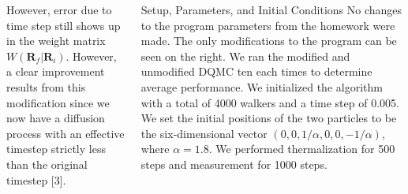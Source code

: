 \documentclass[final]{beamer}
\newlength{\sepwid}
\newlength{\onecolwid}
\newlength{\twocolwid}
\begin{document}
\begin{frame}[t]
\begin{columns}[t]
\begin{column}{\onecolwid}
\begin{block}
{

However, error due to time step still shows up in the weight matrix $W(\mathbf{R}_f|\mathbf{R}_i)$. However, a clear improvement results from this modification since we now have a diffusion process with an effective timestep strictly less than the original timestep [3].
}
\end{block}




\end{column} %


\begin{column}{\twocolwid} %

\begin{columns}[t,totalwidth=\twocolwid] %

\begin{column}{\onecolwid}\vspace{-.6in} %


\begin{block}{Setup, Parameters, and Initial Conditions}
{\Large
No changes to the program parameters from the homework were made. The only modifications to the program can be seen on the right. We ran the modified and unmodified DQMC ten each times to determine average performance. 
We initialized the algorithm with a total of 4000 walkers and a time step of 0.005. We set the initial positions of the two particles to be the six-dimensional vector $(0,0,1/\alpha, 0,0,-1/\alpha)$, where $\alpha = 1.8$. We performed thermalization for 500 steps and measurement for 1000 steps.
}


\end{block}
\end{column}
\end{columns}
\end{column}
\end{columns}
\end{frame}
\end{document}
